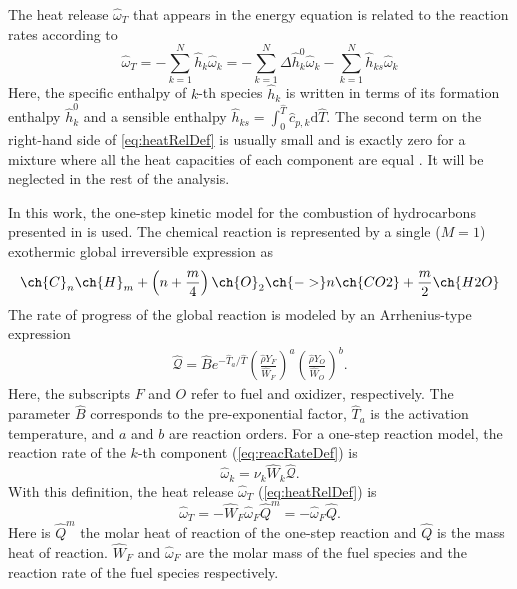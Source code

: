 The heat release $\hat \omega_T$ that appears in the energy equation is related to the reaction rates according to
\begin{equation}\label{eq:heatRelDef}
	\hat \omega _T = - \sum_{k=1}^{N} \hat h_k\hat\omega_k = - \sum_{k=1}^{N}   \Delta \hat h_k^0 \hat\omega_k   - \sum_{k=1}^{N} \hat h_{ks} \hat\omega_k
\end{equation}
Here, the specific enthalpy of $k$-th species $\hat h_k$  is written in terms of its formation enthalpy $\hat h_k^0$ and a sensible enthalpy $\hat h_{ks} =\int_{0}^{\hat{T}} \hat c_{p,k} \text{d}\hat{T} $. The second term on the right-hand side of \cref{eq:heatRelDef} is usually small and is exactly zero for a mixture where all the heat capacities of each component are equal \citep{poinsotTheoreticalNumericalCombustion2005}. It will be neglected in the rest of the analysis.
\newline

In this work,  the one-step kinetic model for the combustion of hydrocarbons presented in \cite{fernandez-tarrazoSimpleOnestepChemistry2006} is used. The chemical reaction is represented by a single ($M = 1$)  exothermic global irreversible expression as
\begin{equation}
	\ch{C}_n \ch{H}_m + \left(n+\frac{m}{4}\right) \ch{O}_2\ch{ -> } n \ch{CO2} + \frac{m}{2} \ch{H2O}
\end{equation}%
The rate of progress of the global reaction is modeled by an Arrhenius-type expression
\begin{align}
	\hat{\mathcal{Q}}= \hat B e^{-\hat T_a/\hat T} \left(\frac{\hat \rho Y_F}{\hat W_F}\right)^a \left(\frac{\hat \rho Y_O}{\hat W_O}\right)^b . \label{eq:DimArr}
\end{align}%
Here, the subscripts $F$ and $O$ refer to fuel and oxidizer, respectively. The parameter $\hat{B}$ corresponds to the pre-exponential factor, $\hat T_a$ is the activation temperature, and $a$ and $b$ are reaction orders. For a one-step reaction model, the reaction rate of the $k$-th component (\cref{eq:reacRateDef}) is
\begin{equation}
	\hat \omega_k  =  \nu_{k} \hat W_k\hat{\mathcal{Q}}.
\end{equation}
With this definition, the heat release $\hat \omega_T$ (\cref{eq:heatRelDef}) is
\begin{equation}
	\hat \omega_T = - \hat W_F \hat \omega_F\hat Q^m = - \hat \omega_F\hat Q .
\end{equation}
Here is $\hat Q^m$ the molar heat of reaction of the one-step reaction and $\hat Q$ is the mass heat of reaction. $\hat W_F$ and $ \hat \omega_F$ are the molar mass of the fuel species and the reaction rate of the fuel species respectively.

